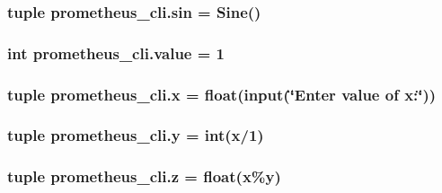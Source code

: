\subsubsection[{sin}]{\setlength{\rightskip}{0pt plus 5cm}tuple prometheus\+\_\+cli.\+sin = {\bf Sine}()}\label{namespaceprometheus__cli_a5c0a64b81243c8257badc58cb7c9dbf3}
\hypertarget{namespaceprometheus__cli_af2e459ba025b091aa627434dd12f5dec}{}
\subsubsection[{value}]{\setlength{\rightskip}{0pt plus 5cm}int prometheus\+\_\+cli.\+value = 1}\label{namespaceprometheus__cli_af2e459ba025b091aa627434dd12f5dec}
\hypertarget{namespaceprometheus__cli_a879d50c5fa9ad1ef941818d332417a9b}{}
\subsubsection[{x}]{\setlength{\rightskip}{0pt plus 5cm}tuple prometheus\+\_\+cli.\+x = float(input(\char`\"{}Enter {\bf value} of x\+:\char`\"{}))}\label{namespaceprometheus__cli_a879d50c5fa9ad1ef941818d332417a9b}
\hypertarget{namespaceprometheus__cli_accf154f79f78ac17fe06c8028e3da02d}{}
\subsubsection[{y}]{\setlength{\rightskip}{0pt plus 5cm}tuple prometheus\+\_\+cli.\+y = int({\bf x}/1)}\label{namespaceprometheus__cli_accf154f79f78ac17fe06c8028e3da02d}
\hypertarget{namespaceprometheus__cli_a1ca8916acd7686537567d5dd0466eeea}{}
\subsubsection[{z}]{\setlength{\rightskip}{0pt plus 5cm}tuple prometheus\+\_\+cli.\+z = float({\bf x}\%{\bf y})}\label{namespaceprometheus__cli_a1ca8916acd7686537567d5dd0466eeea}
